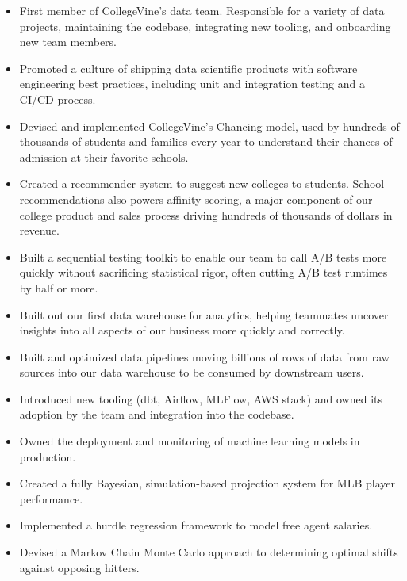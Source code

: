 \documentclass[10pt,a4paper,ragged2e,withhyper]{/Users/matt/documents/GitHub/mrkaye97.github.io/resume/altacv}
\begin{document}
	


	 \makecvheader
		
	
		\begin{itemize}
		\item First member of CollegeVine's data team. Responsible for a variety of data projects, maintaining the codebase, integrating new tooling, and onboarding new team members. 
		\item Promoted a culture of shipping data scientific products with software engineering best practices, including unit and integration testing and a CI/CD process.
		\item Devised and implemented CollegeVine's Chancing model, used by hundreds of thousands of students and families every year to understand their chances of admission at their favorite schools.
		\item Created a recommender system to suggest new colleges to students. School recommendations also powers affinity scoring, a major component of our college product and sales process driving hundreds of thousands of dollars in revenue.
		\item Built a sequential testing toolkit to enable our team to call A/B tests more quickly without sacrificing statistical rigor, often cutting A/B test runtimes by half or more.
		\item Built out our first data warehouse for analytics, helping teammates uncover insights into all aspects of our business more quickly and correctly.
		\item Built and optimized data pipelines moving billions of rows of data from raw sources into our data warehouse to be consumed by downstream users.
		\item Introduced new tooling (dbt, Airflow, MLFlow, AWS stack) and owned its adoption by the team and integration into the codebase.
		\item Owned the deployment and monitoring of machine learning models in production.
		\end{itemize}
		
		\divider
		

		\begin{itemize}
		\item Created a fully Bayesian, simulation-based projection system for MLB player performance.
		\item Implemented a hurdle regression framework to model free agent salaries.
		\item Devised a Markov Chain Monte Carlo approach to determining optimal shifts against opposing hitters.
		\end{itemize}
		
\end{document}

